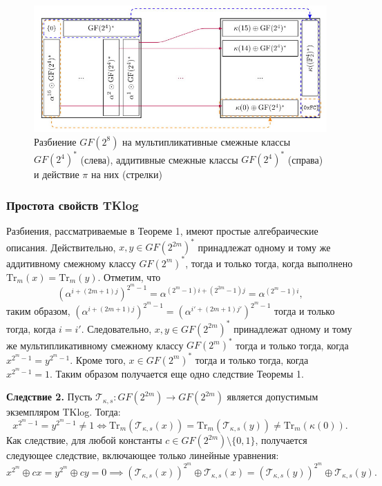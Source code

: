 \begin{figure}
  \centering
  \includegraphics[scale=0.7]{contents/pics/cosets.png}
  \caption{Разбиение $GF(2^8)$ на мультипликативные смежные классы $GF(2^4)^*$ (слева), аддитивные смежные классы $GF(2^4)^*$ (справа) и действие $\pi$ на них (стрелки)}
  \label{fig:fig02}
\end{figure}

\subsubsection{Простота свойств TKlog}
Разбиения, рассматриваемые в Теореме 1, имеют простые алгебраические описания. Действительно,
\( x, y \in GF(2^{2m})^{\ast} \) принадлежат одному и тому же аддитивному смежному классу \( GF(2^m)^{\ast} \), тогда и только тогда, когда выполнено \( \text{Tr}_m(x) = \text{Tr}_m(y) \).
Отметим, что
\[
\left(\alpha^{i+(2m+1)j}\right)^{2^m-1} = \alpha^{(2^m-1)i+(2^{2m}-1)j} = \alpha^{(2^m-1)i},
\]
таким образом, $\left(\alpha^{i+(2m+1)j}\right)^{2^m-1} = \left(\alpha^{i'+(2m+1)j'}\right)^{2^m-1}$ тогда и только тогда, когда \( i = i' \). Следовательно, \( x, y \in GF(2^{2m})^{\ast} \) принадлежат одному и тому же мультипликативному смежному классу \( GF(2^m)^{\ast} \) тогда и только тогда, когда \( x^{2^m-1} = y^{2^m-1} \). Кроме того, \( x \in GF(2^m)^{\ast} \) тогда и только тогда, когда \( x^{2^m-1} = 1 \). Таким образом получается еще одно следствие Теоремы 1.

\textbf{Следствие 2.} Пусть \( \mathscr{T}_{\kappa,s} : GF(2^{2m}) \to GF(2^{2m}) \) является допустимым экземпляром TKlog. Тогда:
\[
x^{2^m-1} = y^{2^m-1} \neq 1 \Leftrightarrow \text{Tr}_m(\mathscr{T}_{\kappa,s}(x)) = \text{Tr}_m(\mathscr{T}_{\kappa,s}(y)) \neq \text{Tr}_m(\kappa(0)).
\]
Как следствие, для любой константы \( c \in GF(2^{2m}) \setminus \{0, 1\} \), получается следующее следствие, включающее только линейные уравнения:
\[
x^{2^m} \oplus cx = y^{2^m} \oplus cy = 0 \implies (\mathscr{T}_{\kappa,s}(x))^{2^m} \oplus \mathscr{T}_{\kappa,s}(x) = (\mathscr{T}_{\kappa,s}(y))^{2^m} \oplus \mathscr{T}_{\kappa,s}(y).
\]

